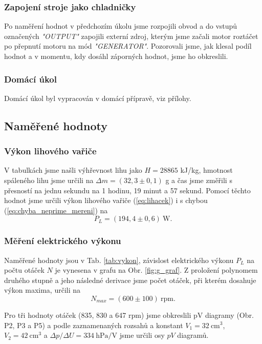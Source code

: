 \documentclass[english]{article}
\newcommand{\unit}[1]{\mathrm{#1}}
\begin{document}
	\subsubsection{Zapojení stroje jako chladničky}
		Po naměření hodnot v předchozím úkolu jsme rozpojili obvod a do vstupů označených \emph{"OUTPUT"} zapojili externí zdroj, kterým jsme začali motor roztáčet po přepnutí motoru na mód \emph{"GENERATOR"}. Pozorovali jsme, jak klesal podíl hodnot a v momentu, kdy dosáhl záporných hodnot, jsme ho obkreslili. 
	
	\subsubsection{Domácí úkol}
		Domácí úkol byl vypracován v domácí přípravě, viz přílohy.
	
\subsection{Naměřené hodnoty}
	\subsubsection{Výkon lihového vařiče}
		V tabulkách \cite{bib:tabulky} jsme našli výhřevnost lihu jako $H = 28865$ kJ/kg, hmotnost spáleného lihu jsme určili na $\Delta m = (32,3 \pm 0,1)$ g a čas jsme změřili s přesností na jednu sekundu na 1 hodinu, 19 minut a 57 sekund. Pomocí těchto hodnot jsme určili výkon lihového vařiče (\ref{eq:lihacek}) i s chybou (\ref{eq:chyba_neprime_mereni}) na
		\begin{equation}
		P_L = (194,4 \pm 0,6)\ \unit{W}.
		\end{equation}
	
	\subsubsection{Měření elektrického výkonu}
		Naměřené hodnoty jsou v Tab. \ref{tab:vykon}, závislost elektrického výkonu $P_L$ na počtu otáček $N$ je vynesena v grafu na Obr. \ref{fig:g_graf}. Z proložení polynomem druhého stupně a jeho následné derivace jsme počet otáček, při kterém dosahuje výkon maxima, určili na 
		\begin{equation}
		N_{max} = (600 \pm 100)\mathrm{\ rpm}.
		\end{equation} 
		
		Pro tři hodnoty otáček (835, 830 a 647 rpm) jsme obkreslili pV diagramy (Obr. P2, P3 a P5) a podle zaznamenaných rozsahů a konstant $V_1 = 32\ \unit{cm^3}$, $V_2 = 42\ \unit{cm^3}$ a $\Delta p/\Delta U = 334\ \unit{hPa/V}$ jsme určili osy $pV$ diagramů. 
	
\end{document}
